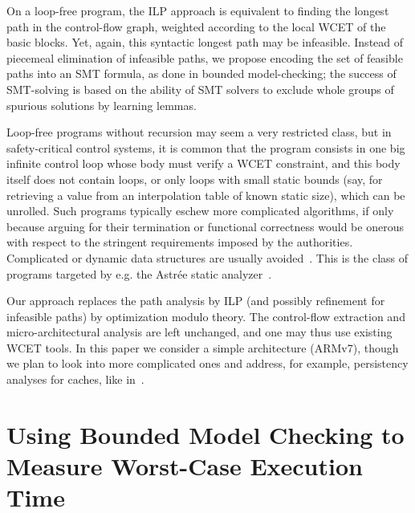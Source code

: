 \documentclass[a4paper,twocolumn,11pt]{article}
\begin{document}
On a loop-free program, the ILP approach is equivalent to finding the longest path in the control-flow graph, weighted according to the local WCET of the basic blocks.
Yet, again, this syntactic longest path may be infeasible.
Instead of piecemeal elimination of infeasible paths, we propose encoding the set of feasible paths into an SMT formula, as done in bounded model-checking; the success of SMT-solving is based on the ability of SMT solvers to exclude whole groups of spurious solutions by learning lemmas.

Loop-free programs without recursion may seem a very restricted class, but in safety-critical control systems, it is common that the program consists in one big infinite control loop whose body must verify a WCET constraint, and this body itself does not contain loops, or only loops with small static bounds (say, for retrieving a value from an interpolation table of known static size), which can be unrolled.
Such programs typically eschew more complicated algorithms, if only because arguing for their termination or functional correctness would be onerous with respect to the stringent requirements imposed by the authorities. Complicated or dynamic data structures are usually avoided~\parencite[ch. II]{li-et-CADICS97}.
This is the class of programs targeted by e.g. the Astr\'ee static analyzer~\parencite{DBLP:conf/esop/CousotCFMMMR05}.

Our approach replaces the path analysis by ILP (and possibly refinement for infeasible paths) by optimization modulo theory. The control-flow extraction and micro-architectural analysis are left unchanged, and one may thus use existing WCET tools. In this paper we consider a simple architecture (ARMv7), though we plan to look into more complicated ones and address, for example, persistency analyses for caches, like in~\parencite{DBLP:conf/rtas/HuynhJR11}.


\section{Using Bounded Model Checking to Measure Worst-Case Execution Time}
\label{sec:bmc}
\end{document}
